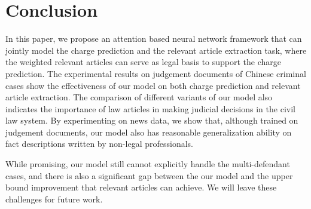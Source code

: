 \section{Conclusion}
In this paper, we propose an attention based neural network framework that can jointly model the charge prediction and the relevant article extraction task, where the weighted relevant articles can serve as legal basis to support the charge prediction.
The experimental results on judgement documents of Chinese criminal cases show the effectiveness of our model on both charge prediction and relevant article extraction.
The comparison of different variants of our model also indicates the importance of law articles in making judicial decisions in the civil law system.
By experimenting on news data, we show that, although trained on judgement documents, our model also has reasonable generalization ability on fact descriptions written by non-legal professionals.

While promising, our model still cannot explicitly handle the multi-defendant cases, and there is also a significant gap between the our model and the upper bound improvement that relevant articles can achieve. We will leave these challenges for future work.


